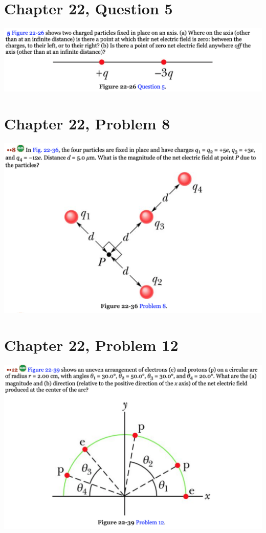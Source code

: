 \documentclass[12pt]{article}
\begin{document}
\pagebreak
\section*{Chapter 22, Question 5}
\includegraphics[width=\textwidth]{picture_4.png}


\pagebreak
\section*{Chapter 22, Problem 8}
\includegraphics[width=\textwidth]{picture_5.png}


\pagebreak
\section*{Chapter 22, Problem 12}
\includegraphics[width=\textwidth]{picture_6.png}
\end{document}
